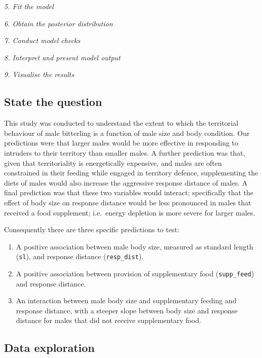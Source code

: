 \documentclass[
]{book}
\begin{document}
\emph{5. Fit the model}

\emph{6. Obtain the posterior distribution}

\emph{7. Conduct model checks}

\emph{8. Interpret and present model output}

\emph{9. Visualise the results}

\hypertarget{state-the-question}{%
\subsection{State the question}\label{state-the-question}}

This study was conducted to understand the extent to which the territorial behaviour of male bitterling is a function of male size and body condition. Our predictions were that larger males would be more effective in responding to intruders to their territory than smaller males. A further prediction was that, given that territoriality is energetically expensive, and males are often constrained in their feeding while engaged in territory defence, supplementing the diets of males would also increase the aggressive response distance of males. A final prediction was that these two variables would interact; specifically that the effect of body size on response distance would be less pronounced in males that received a food supplement; i.e.~energy depletion is more severe for larger males.

Consequently there are three specific predictions to test:

\begin{enumerate}
\def\labelenumi{\arabic{enumi}.}
\item
  A positive association between male body size, measured as standard length (\texttt{sl}), and response distance (\texttt{resp\_dist}).
\item
  A positive association between provision of supplementary food (\texttt{supp\_feed}) and response distance.
\item
  An interaction between male body size and supplementary feeding and response distance, with a steeper slope between body size and response distance for males that did not receive supplementary food.
\end{enumerate}

\hypertarget{data-exploration-1}{%
\subsection{Data exploration}\label{data-exploration-1}}
\end{document}
